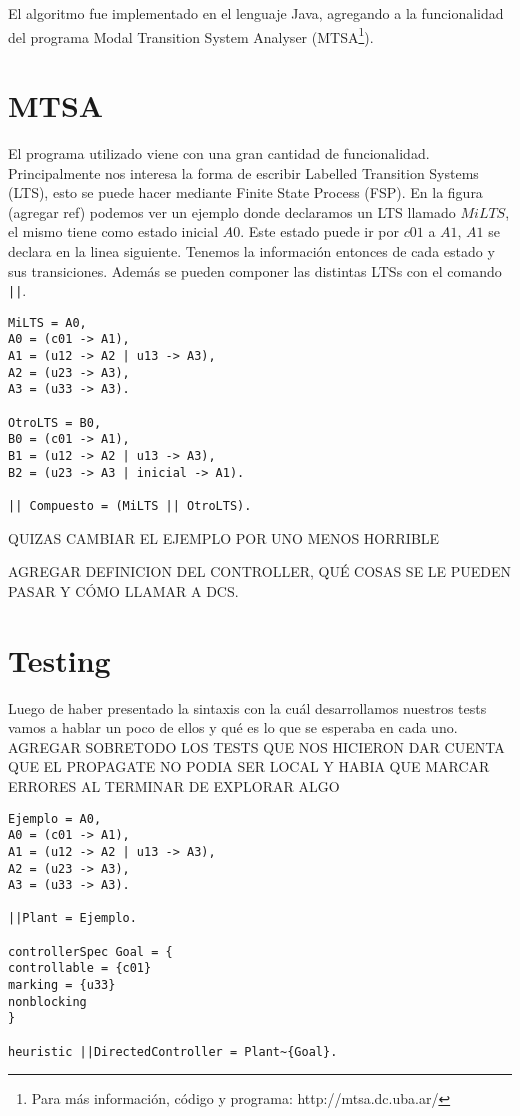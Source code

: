 
El algoritmo fue implementado en el lenguaje Java, agregando a la funcionalidad del programa Modal Transition System Analyser (MTSA\footnote{Para más información, código y programa: http://mtsa.dc.uba.ar/}).

\section{MTSA}
El programa utilizado viene con una gran cantidad de funcionalidad. Principalmente nos interesa la forma de escribir Labelled Transition Systems (LTS), esto se puede hacer mediante Finite State Process (FSP). En la figura (agregar ref) podemos ver un ejemplo donde declaramos un LTS llamado $MiLTS$, el mismo tiene como estado inicial $A0$. Este estado puede ir por $c01$ a $A1$, $A1$ se declara en la linea siguiente. Tenemos la información entonces de cada estado y sus transiciones. Además se pueden componer las distintas LTSs con el comando \texttt{||}.

\begin{lstlisting}[language = mtsa, caption=Ejemplo de LTS y composición]
MiLTS = A0,
A0 = (c01 -> A1),
A1 = (u12 -> A2 | u13 -> A3),
A2 = (u23 -> A3),
A3 = (u33 -> A3).

OtroLTS = B0,
B0 = (c01 -> A1),
B1 = (u12 -> A2 | u13 -> A3),
B2 = (u23 -> A3 | inicial -> A1).

|| Compuesto = (MiLTS || OtroLTS).
\end{lstlisting}
QUIZAS CAMBIAR EL EJEMPLO POR UNO MENOS HORRIBLE

AGREGAR DEFINICION DEL CONTROLLER, QUÉ COSAS SE LE PUEDEN PASAR Y CÓMO LLAMAR A DCS.

\section{Testing}
Luego de haber presentado la sintaxis con la cuál desarrollamos nuestros tests vamos a hablar un poco de ellos y qué es lo que se esperaba en cada uno. AGREGAR SOBRETODO LOS TESTS QUE NOS HICIERON DAR CUENTA QUE EL PROPAGATE NO PODIA SER LOCAL Y HABIA QUE MARCAR ERRORES AL TERMINAR DE EXPLORAR ALGO

\begin{lstlisting}[language = mtsa, caption=Ejemplo de test]
Ejemplo = A0,
A0 = (c01 -> A1),
A1 = (u12 -> A2 | u13 -> A3),
A2 = (u23 -> A3),
A3 = (u33 -> A3).

||Plant = Ejemplo.

controllerSpec Goal = {
controllable = {c01}
marking = {u33}
nonblocking
}

heuristic ||DirectedController = Plant~{Goal}.
\end{lstlisting}
